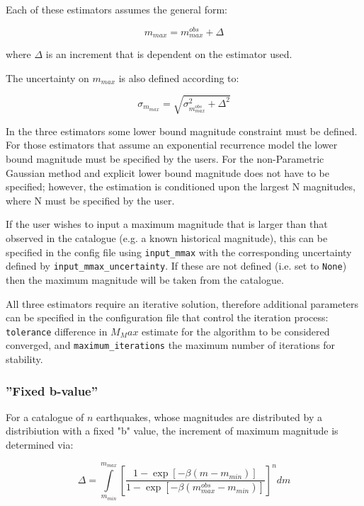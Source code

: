 Each of these estimators assumes the general form:

\begin{equation}
m_{max} = m_{max}^{obs} + \Delta
\end{equation}

where $\Delta$ is an increment that is dependent on the estimator used.

The uncertainty on $m_{max}$ is also defined according to:

\begin{equation}
    \sigma_{m_{max}} = \sqrt{\sigma_{m_{max}^{obs}}^2 + \Delta^{2}}
\end{equation}

In the three estimators some lower bound magnitude constraint must be defined. For those estimators that assume an exponential recurrence model the lower bound magnitude must be specified by the users. For the non-Parametric Gaussian method and explicit lower bound magnitude does not have to be specified; however, the estimation is conditioned upon the largest N magnitudes, where N must be specified by the user.

If the user wishes to input a maximum magnitude that is larger than that observed in the catalogue (e.g. a known historical magnitude), this can be specified in the config file using \verb=input_mmax= with the corresponding uncertainty defined by \verb=input_mmax_uncertainty=. If these are not defined (i.e. set to \verb=None=) then the maximum magnitude will be taken from the catalogue.

All three estimators require an iterative solution, therefore additional parameters can be specified in the configuration file that control the iteration process: \verb=tolerance= difference in $M_Max$ estimate for the algorithm to be considered converged, and \verb=maximum_iterations= the maximum number of iterations for stability. 


\subsubsection{''Fixed b-value''}

For a catalogue of $n$ earthquakes, whose magnitudes are distributed by a \cite{GutenbergRichter1944} distribiution with a fixed "b" value, the increment of maximum magnitude is determined via:

\begin{equation}
\Delta = \int\limits_{m_{min}} ^{m_{max}} \left[ {\frac{1 - \exp \left[ {-\beta \left( {m - m_{min}} \right)} \right]}{1 - \exp \left[ {-\beta \left( {m_{max}^{obs} - m_{min}} \right) } \right]}} \right] ^n dm
\end{equation}



